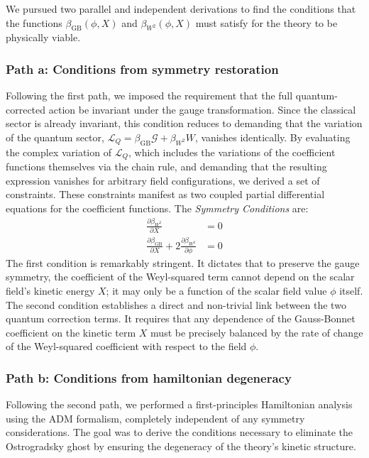 \documentclass[twocolumn]{aastex631}
\begin{document}
We pursued two parallel and independent derivations to find the conditions that the functions $\beta_{\text{GB}}(\phi, X)$ and $\beta_{W^2}(\phi, X)$ must satisfy for the theory to be physically viable.

\subsubsection{Path a: Conditions from symmetry restoration}

Following the first path, we imposed the requirement that the full quantum-corrected action be invariant under the gauge transformation. Since the classical sector is already invariant, this condition reduces to demanding that the variation of the quantum sector, $\mathcal{L}_Q = \beta_{\text{GB}}\mathcal{G} + \beta_{W^2}W$, vanishes identically. By evaluating the complex variation of $\mathcal{L}_Q$, which includes the variations of the coefficient functions themselves via the chain rule, and demanding that the resulting expression vanishes for arbitrary field configurations, we derived a set of constraints. These constraints manifest as two coupled partial differential equations for the coefficient functions. The \textit{Symmetry Conditions} are:
\begin{align}
    \frac{\partial\beta_{W^2}}{\partial X} &= 0 \label{eq:sym_cond1} \\
    \frac{\partial\beta_{\text{GB}}}{\partial X} + 2 \frac{\partial\beta_{W^2}}{\partial\phi} &= 0 \label{eq:sym_cond2}
\end{align}
The first condition is remarkably stringent. It dictates that to preserve the gauge symmetry, the coefficient of the Weyl-squared term cannot depend on the scalar field's kinetic energy $X$; it may only be a function of the scalar field value $\phi$ itself. The second condition establishes a direct and non-trivial link between the two quantum correction terms. It requires that any dependence of the Gauss-Bonnet coefficient on the kinetic term $X$ must be precisely balanced by the rate of change of the Weyl-squared coefficient with respect to the field $\phi$.

\subsubsection{Path b: Conditions from hamiltonian degeneracy}

Following the second path, we performed a first-principles Hamiltonian analysis using the ADM formalism, completely independent of any symmetry considerations. The goal was to derive the conditions necessary to eliminate the Ostrogradsky ghost by ensuring the degeneracy of the theory's kinetic structure.
\end{document}

